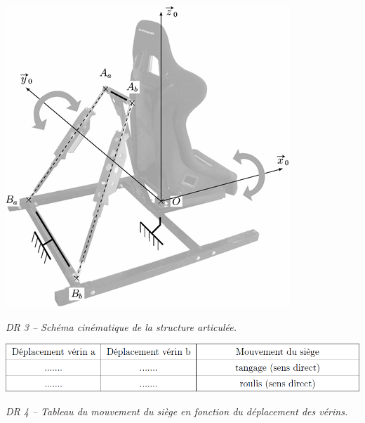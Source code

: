 \documentclass[10pt,fleqn]{article} %
\begin{document}
\begin{center}
\includegraphics[width=.9\linewidth]{images/DR_03}

\textit{DR 3 -- Schéma cinématique de la structure articulée.}
\end{center}

\begin{center}
\includegraphics[width=.9\linewidth]{images/DR_04}

\textit{DR 4 -- Tableau du mouvement du siège en fonction du déplacement des vérins.}
\end{center}
\end{document}
